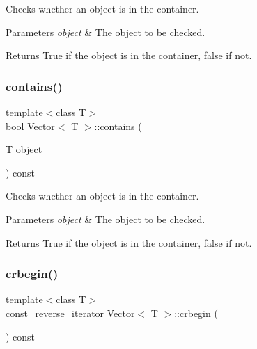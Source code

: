 Checks whether an object is in the container. 
\begin{DoxyParams}{Parameters}
{\em object} & The object to be checked. \\
\hline
\end{DoxyParams}
\begin{DoxyReturn}{Returns}
True if the object is in the container, false if not. 
\end{DoxyReturn}
\mbox{\label{classVector_a20b0a89d6e0ee21d07315121867d84ef}} 
\subsubsection{\texorpdfstring{contains()}{contains()}\hspace{0.1cm}{\footnotesize\ttfamily [2/2]}}
{\footnotesize\ttfamily template$<$class T$>$ \\
bool \hyperlink{classVector}{Vector}$<$ T $>$\+::contains (\begin{DoxyParamCaption}\item[{T}]{object }\end{DoxyParamCaption}) const\hspace{0.3cm}{\ttfamily [inline]}}

Checks whether an object is in the container. 
\begin{DoxyParams}{Parameters}
{\em object} & The object to be checked. \\
\hline
\end{DoxyParams}
\begin{DoxyReturn}{Returns}
True if the object is in the container, false if not. 
\end{DoxyReturn}
\mbox{\label{classVector_af5f7e3324c56c546c88099d12820c432}} 
\subsubsection{\texorpdfstring{crbegin()}{crbegin()}\hspace{0.1cm}{\footnotesize\ttfamily [1/2]}}
{\footnotesize\ttfamily template$<$class T$>$ \\
\hyperlink{classVector_a963c193ac2399eed1cf20d74f559ef2a}{const\+\_\+reverse\+\_\+iterator} \hyperlink{classVector}{Vector}$<$ T $>$\+::crbegin (\begin{DoxyParamCaption}{ }\end{DoxyParamCaption}) const\hspace{0.3cm}{\ttfamily [inline]}}

